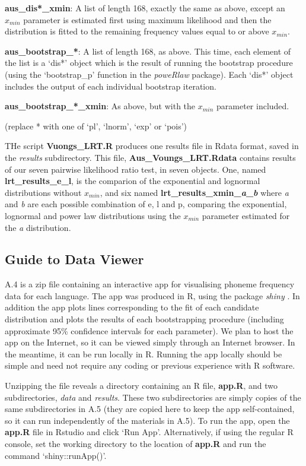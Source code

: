 \textbf{aus\_dis*\_xmin}: A list of length 168, exactly the same as
above, except an \(x_{min}\) parameter is estimated first using maximum
likelihood and then the distribution is fitted to the remaining
frequency values equal to or above \(x_{min}\).

\textbf{aus\_bootstrap\_*}: A list of length 168, as above. This time,
each element of the list is a `dis*' object which is the result of
running the bootstrap procedure (using the `bootstrap\_p' function in
the \emph{poweRlaw} package). Each `dis*' object includes the output of
each individual bootstrap iteration.

\textbf{aus\_bootstrap\_*\_xmin}: As above, but with the \(x_{min}\)
parameter included.

(replace * with one of `pl', `lnorm', `exp' or `pois')

THe script \textbf{Vuongs\_LRT.R} produces one results file in Rdata
format, saved in the \emph{results} subdirectory. This file,
\textbf{Aus\_Voungs\_LRT.Rdata} contains results of our seven pairwise
likelihood ratio test, in seven objects. One, named
\textbf{lrt\_results\_e\_l}, is the comparion of the exponential and
lognormal distributions without \(x_{min}\), and six named
\textbf{lrt\_results\_xmin\_\emph{a}\_\emph{b}} where \emph{a} and
\emph{b} are each possible combination of e, l and p, comparing the
exponential, lognormal and power law distributions using the \(x_{min}\)
parameter estimated for the \emph{a} distribution.

\hypertarget{guide-to-data-viewer}{%
\subsection{Guide to Data Viewer}\label{guide-to-data-viewer}}

A.4 is a zip file containing an interactive app for visualising phoneme
frequency data for each language. The app was produced in R, using the
package \emph{shiny} \autocite{chang_shiny_2018}. In addition the app
plots lines corresponding to the fit of each candidate distribution and
plots the results of each bootstrapping procedure (including approximate
95\% confidence intervals for each parameter). We plan to host the app
on the Internet, so it can be viewed simply through an Internet browser.
In the meantime, it can be run locally in R. Running the app locally
should be simple and need not require any coding or previous experience
with R software.

Unzipping the file reveals a directory containing an R file,
\textbf{app.R}, and two subdirectories, \emph{data} and \emph{results}.
These two subdirectories are simply copies of the same subdirectories in
A.5 (they are copied here to keep the app self-contained, so it can run
independently of the materials in A.5). To run the app, open the
\textbf{app.R} file in Rstudio and click `Run App'. Alternatively, if
using the regular R console, set the working directory to the location
of \textbf{app.R} and run the command `shiny::runApp()'.


